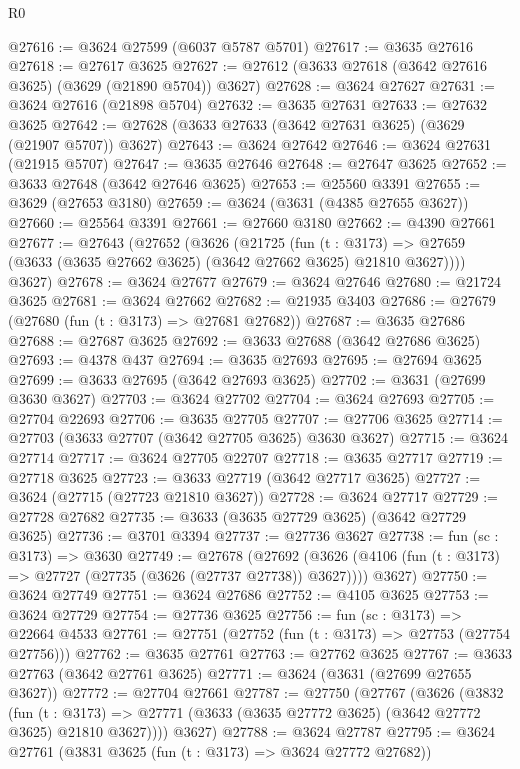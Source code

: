 \begin{lexlean}{R0}
\begin{coremodule}
@27616 := @3624 @27599 (@6037 @5787 @5701)
@27617 := @3635 @27616
@27618 := @27617 @3625
@27627 := @27612 (@3633 @27618 (@3642 @27616 @3625) (@3629 (@21890 @5704)) @3627)
@27628 := @3624 @27627
@27631 := @3624 @27616 (@21898 @5704)
@27632 := @3635 @27631
@27633 := @27632 @3625
@27642 := @27628 (@3633 @27633 (@3642 @27631 @3625) (@3629 (@21907 @5707)) @3627)
@27643 := @3624 @27642
@27646 := @3624 @27631 (@21915 @5707)
@27647 := @3635 @27646
@27648 := @27647 @3625
@27652 := @3633 @27648 (@3642 @27646 @3625)
@27653 := @25560 @3391
@27655 := @3629 (@27653 @3180)
@27659 := @3624 (@3631 (@4385 @27655 @3627))
@27660 := @25564 @3391
@27661 := @27660 @3180
@27662 := @4390 @27661
@27677 := @27643
    (@27652
      (@3626
        (@21725
          (fun (t : @3173) =>
          @27659 (@3633 (@3635 @27662 @3625) (@3642 @27662 @3625) @21810 @3627))))
      @3627)
@27678 := @3624 @27677
@27679 := @3624 @27646
@27680 := @21724 @3625
@27681 := @3624 @27662
@27682 := @21935 @3403
@27686 := @27679 (@27680 (fun (t : @3173) => @27681 @27682))
@27687 := @3635 @27686
@27688 := @27687 @3625
@27692 := @3633 @27688 (@3642 @27686 @3625)
@27693 := @4378 @437
@27694 := @3635 @27693
@27695 := @27694 @3625
@27699 := @3633 @27695 (@3642 @27693 @3625)
@27702 := @3631 (@27699 @3630 @3627)
@27703 := @3624 @27702
@27704 := @3624 @27693
@27705 := @27704 @22693
@27706 := @3635 @27705
@27707 := @27706 @3625
@27714 := @27703 (@3633 @27707 (@3642 @27705 @3625) @3630 @3627)
@27715 := @3624 @27714
@27717 := @3624 @27705 @22707
@27718 := @3635 @27717
@27719 := @27718 @3625
@27723 := @3633 @27719 (@3642 @27717 @3625)
@27727 := @3624 (@27715 (@27723 @21810 @3627))
@27728 := @3624 @27717
@27729 := @27728 @27682
@27735 := @3633 (@3635 @27729 @3625) (@3642 @27729 @3625)
@27736 := @3701 @3394
@27737 := @27736 @3627
@27738 := fun (sc : @3173) => @3630
@27749 := @27678
    (@27692
      (@3626 (@4106 (fun (t : @3173) => @27727 (@27735 (@3626 (@27737 @27738)) @3627))))
      @3627)
@27750 := @3624 @27749
@27751 := @3624 @27686
@27752 := @4105 @3625
@27753 := @3624 @27729
@27754 := @27736 @3625
@27756 := fun (sc : @3173) => @22664 @4533
@27761 := @27751 (@27752 (fun (t : @3173) => @27753 (@27754 @27756)))
@27762 := @3635 @27761
@27763 := @27762 @3625
@27767 := @3633 @27763 (@3642 @27761 @3625)
@27771 := @3624 (@3631 (@27699 @27655 @3627))
@27772 := @27704 @27661
@27787 := @27750
    (@27767
      (@3626
        (@3832
          (fun (t : @3173) =>
          @27771 (@3633 (@3635 @27772 @3625) (@3642 @27772 @3625) @21810 @3627))))
      @3627)
@27788 := @3624 @27787
@27795 := @3624 @27761 (@3831 @3625 (fun (t : @3173) => @3624 @27772 @27682))

\end{coremodule}
\end{lexlean}

